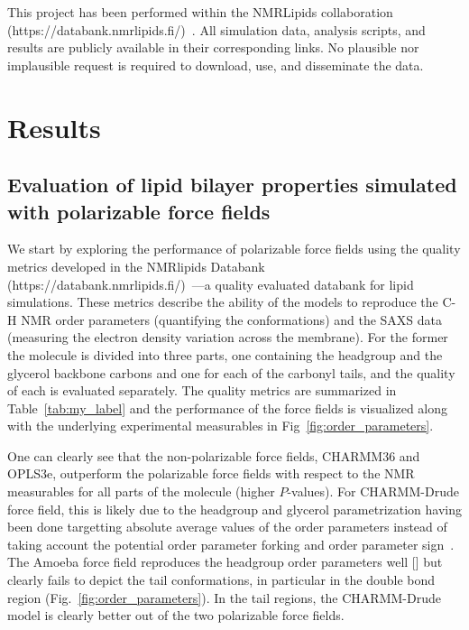 \documentclass[journal=jacsat,manuscript=article,layout=singlecolumn]{achemso}
\begin{document}
This project has been performed within the NMRLipids collaboration (https://databank.nmrlipids.fi/)~\cite{Databank}. All simulation data, analysis scripts, and results are publicly available in their corresponding links. No plausible nor implausible request is required to download, use, and disseminate the data. 




\section{Results}

\subsection{Evaluation of lipid bilayer properties simulated with polarizable force fields}

We start by exploring the performance of polarizable force fields using the quality metrics developed in the NMRlipids Databank (https://databank.nmrlipids.fi/)~\cite{Databank}---a quality evaluated databank for lipid simulations. These metrics describe the ability of the models to reproduce the C-H NMR order parameters (quantifying the conformations) and the SAXS data (measuring the electron density variation across the membrane). For the former the molecule is divided into three parts, one containing the headgroup and the glycerol backbone carbons and one for each of the carbonyl tails, and the quality of each is evaluated separately. The quality metrics are summarized in Table~\ref{tab:my_label} and the performance of the force fields is visualized along with the underlying experimental measurables in Fig~\ref{fig:order_parameters}. 

One can clearly see that the non-polarizable force fields, CHARMM36 and OPLS3e, outperform the polarizable force fields with respect to the NMR measurables for all parts of the molecule (higher $P$-values). For CHARMM-Drude force field, this is likely due to the headgroup and glycerol parametrization having been done targetting absolute average values of the order parameters instead of taking account the potential order parameter forking and order parameter sign~\cite{Antila2022}. The Amoeba force field reproduces the headgroup order parameters well [] but clearly fails to depict the tail conformations, in particular in the double bond region (Fig.~\ref{fig:order_parameters}). In the tail regions, the CHARMM-Drude model is clearly better out of the two polarizable force fields. 
\end{document}
